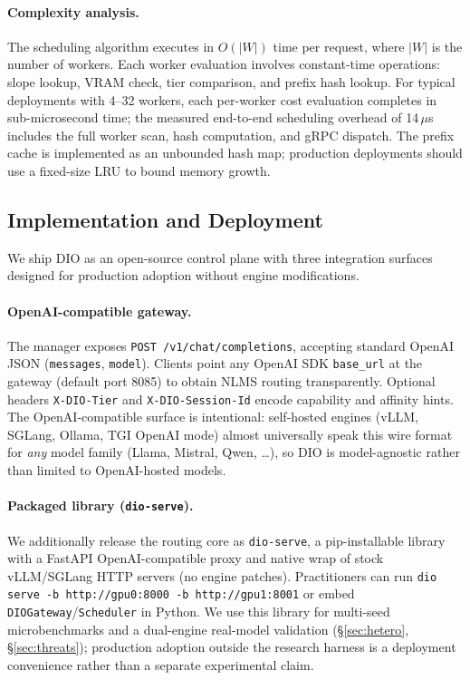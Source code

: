 \documentclass[10pt,twocolumn,letterpaper]{article}
\begin{document}
\paragraph{Complexity analysis.}
The scheduling algorithm executes in $O(|W|)$ time per request, where $|W|$ is the number of workers. Each worker evaluation involves constant-time operations: slope lookup, VRAM check, tier comparison, and prefix hash lookup. For typical deployments with 4--32 workers, each per-worker cost evaluation completes in sub-microsecond time; the measured end-to-end scheduling overhead of 14\,$\mu$s includes the full worker scan, hash computation, and gRPC dispatch. The prefix cache is implemented as an unbounded hash map; production deployments should use a fixed-size LRU to bound memory growth.

\subsection{Implementation and Deployment}
\label{sec:implementation}

We ship DIO as an open-source control plane with three integration surfaces designed for production adoption without engine modifications.

\paragraph{OpenAI-compatible gateway.}
The manager exposes \texttt{POST /v1/chat/completions}, accepting standard OpenAI JSON (\texttt{messages}, \texttt{model}). Clients point any OpenAI SDK \texttt{base\_url} at the gateway (default port 8085) to obtain NLMS routing transparently. Optional headers \texttt{X-DIO-Tier} and \texttt{X-DIO-Session-Id} encode capability and affinity hints. The OpenAI-compatible surface is intentional: self-hosted engines (vLLM, SGLang, Ollama, TGI OpenAI mode) almost universally speak this wire format for \emph{any} model family (Llama, Mistral, Qwen, \ldots), so DIO is model-agnostic rather than limited to OpenAI-hosted models.

\paragraph{Packaged library (\texttt{dio-serve}).}
We additionally release the routing core as \texttt{dio-serve}, a pip-installable library with a FastAPI OpenAI-compatible proxy and native wrap of stock vLLM/SGLang HTTP servers (no engine patches). Practitioners can run \texttt{dio serve -b http://gpu0:8000 -b http://gpu1:8001} or embed \texttt{DIOGateway}/\texttt{Scheduler} in Python. We use this library for multi-seed microbenchmarks and a dual-engine real-model validation (\S\ref{sec:hetero}, \S\ref{sec:threats}); production adoption outside the research harness is a deployment convenience rather than a separate experimental claim.
\end{document}
